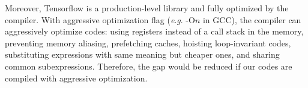 \documentclass[a4paper,12pt]{article}
\newcommand{\eg}{\textit{e}.\textit{g}.}
\begin{document}
Moreover, Tensorflow is a production-level library and fully optimized by the compiler.  With aggressive optimization flag (\eg{} -O$n$ in GCC), the compiler can aggressively optimize codes: using registers instead of a call stack in the memory, preventing memory aliasing, prefetching caches, hoisting loop-invariant codes, substituting expressions with same meaning but cheaper ones, and sharing common subexpressions. Therefore, the gap would be reduced if our codes are compiled with aggressive optimization.
\end{document}
